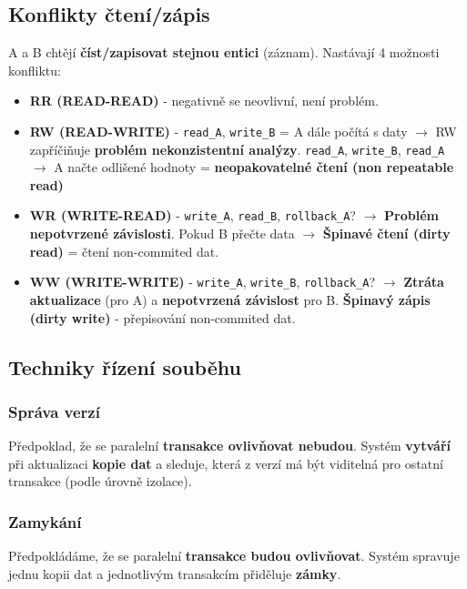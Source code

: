 \subsection{Konflikty čtení/zápis}
A a B chtějí \textbf{číst/zapisovat stejnou entici} (záznam). Nastávají 4 možnosti konfliktu:
\begin{itemize}
\item \textbf{RR (READ-READ)} - negativně se neovlivní, není problém.
\item \textbf{RW (READ-WRITE)} - \texttt{read\_A}, \texttt{write\_B} = A dále počítá s daty $\rightarrow$ RW zapříčiňuje \textbf{problém nekonzistentní analýzy}. \texttt{read\_A}, \texttt{write\_B}, \texttt{read\_A} $\rightarrow$ A načte odlišené hodnoty = \textbf{neopakovatelné čtení (non repeatable read)}
\item \textbf{WR (WRITE-READ)} - \texttt{write\_A}, \texttt{read\_B}, \texttt{rollback\_A}? $\rightarrow$ \textbf{Problém nepotvrzené závislosti}. Pokud B přečte data $\rightarrow$ \textbf{Špinavé čtení (dirty read)} = čtení non-commited dat.
\item \textbf{WW (WRITE-WRITE)} - \texttt{write\_A}, \texttt{write\_B}, \texttt{rollback\_A}? $\rightarrow$ \textbf{Ztráta aktualizace} (pro A) a \textbf{nepotvrzená závislost} pro B. \textbf{Špinavý zápis}\textbf{ (dirty write)} - přepisování non-commited dat.
\end{itemize}

\subsection{Techniky řízení souběhu}
\subsubsection{Správa verzí}
Předpoklad, že se paralelní \textbf{transakce ovlivňovat nebudou}. Systém \textbf{vytváří} při aktualizaci\textbf{ kopie dat }a sleduje, která z verzí má být viditelná pro ostatní transakce (podle úrovně izolace).

\subsubsection{Zamykání}
Předpokládáme, že se paralelní \textbf{transakce budou ovlivňovat}. Systém spravuje jednu kopii dat a jednotlivým transakcím přiděluje \textbf{zámky}.

